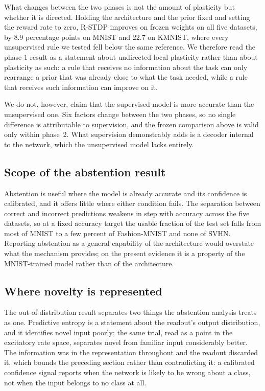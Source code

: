 What changes between the two phases is not the amount of plasticity but whether it is
directed. Holding the architecture and the prior fixed and setting the reward rate to
zero, R-STDP improves on frozen weights on all five datasets, by $8.9$ percentage points
on MNIST and $22.7$ on KMNIST, where every unsupervised rule we tested fell below the
same reference. We therefore read the phase-1 result as a statement about undirected
local plasticity rather than about plasticity as such: a rule that receives no
information about the task can only rearrange a prior that was already close to what the
task needed, while a rule that receives such information can improve on it.

We do not, however, claim that the supervised model is more accurate than the
unsupervised one. Six factors change between the two phases, so no single difference is
attributable to supervision, and the frozen comparison above is valid only within
phase~2. What supervision demonstrably adds is a decoder internal to the network, which
the unsupervised model lacks entirely.

\subsection{Scope of the abstention result}

Abstention is useful where the model is already accurate and its confidence is
calibrated, and it offers little where either condition fails. The separation between
correct and incorrect predictions weakens in step with accuracy across the five datasets,
so at a fixed accuracy target the usable fraction of the test set falls from most of
MNIST to a few percent of Fashion-MNIST and none of SVHN. Reporting abstention as a
general capability of the architecture would overstate what the mechanism provides; on
the present evidence it is a property of the MNIST-trained model rather than of the
architecture.

\subsection{Where novelty is represented}

The out-of-distribution result separates two things the abstention analysis treats as
one. Predictive entropy is a statement about the readout's output distribution, and it
identifies novel input poorly; the same trial, read as a point in the excitatory rate
space, separates novel from familiar input considerably better. The information was in
the representation throughout and the readout discarded it, which bounds the preceding
section rather than contradicting it: a calibrated confidence signal reports when the
network is likely to be wrong about a class, not when the input belongs to no class at
all.

